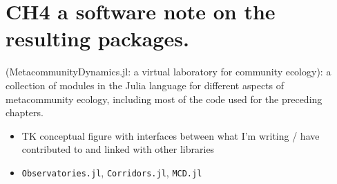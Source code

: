 \documentclass[10pt,oneside]{article}
\begin{document}
\hypertarget{ch4-a-software-note-on-the-resulting-packages.}{%
\section{CH4 a software note on the resulting
packages.}\label{ch4-a-software-note-on-the-resulting-packages.}}

(MetacommunityDynamics.jl: a virtual laboratory for community ecology):
a collection of modules in the Julia language for different aspects of
metacommunity ecology, including most of the code used for the preceding
chapters.

\begin{itemize}
\item
  TK conceptual figure with interfaces between what I'm writing / have
  contributed to and linked with other libraries
\item
  \texttt{Observatories.jl}, \texttt{Corridors.jl}, \texttt{MCD.jl}
\end{itemize}
\end{document}
